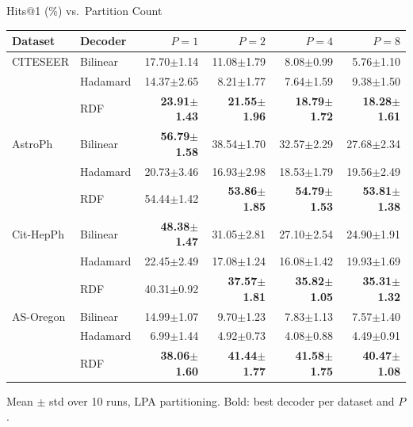 \documentclass[aspectratio=169]{beamer}
\begin{document}
\begin{frame}{Hits@1 (\%) vs.\ Partition Count}
  \scriptsize
  \begin{tabular}{llrrrr}
    \toprule
    Dataset & Decoder & $P{=}1$ & $P{=}2$ & $P{=}4$ & $P{=}8$ \\
    \midrule
    CITESEER  & Bilinear  & 17.70$\pm$1.14 & 11.08$\pm$1.79 & 8.08$\pm$0.99 & 5.76$\pm$1.10 \\
              & Hadamard  & 14.37$\pm$2.65 & 8.21$\pm$1.77 & 7.64$\pm$1.59 & 9.38$\pm$1.50 \\
              & RDF       & \textbf{23.91$\pm$1.43} & \textbf{21.55$\pm$1.96} & \textbf{18.79$\pm$1.72} & \textbf{18.28$\pm$1.61} \\
    \midrule
    AstroPh   & Bilinear  & \textbf{56.79$\pm$1.58} & 38.54$\pm$1.70 & 32.57$\pm$2.29 & 27.68$\pm$2.34 \\
              & Hadamard  & 20.73$\pm$3.46 & 16.93$\pm$2.98 & 18.53$\pm$1.79 & 19.56$\pm$2.49 \\
              & RDF       & 54.44$\pm$1.42 & \textbf{53.86$\pm$1.85} & \textbf{54.79$\pm$1.53} & \textbf{53.81$\pm$1.38} \\
    \midrule
    Cit-HepPh & Bilinear  & \textbf{48.38$\pm$1.47} & 31.05$\pm$2.81 & 27.10$\pm$2.54 & 24.90$\pm$1.91 \\
              & Hadamard  & 22.45$\pm$2.49 & 17.08$\pm$1.24 & 16.08$\pm$1.42 & 19.93$\pm$1.69 \\
              & RDF       & 40.31$\pm$0.92 & \textbf{37.57$\pm$1.81} & \textbf{35.82$\pm$1.05} & \textbf{35.31$\pm$1.32} \\
    \midrule
    AS-Oregon & Bilinear  & 14.99$\pm$1.07 & 9.70$\pm$1.23 & 7.83$\pm$1.13 & 7.57$\pm$1.40 \\
              & Hadamard  & 6.99$\pm$1.44 & 4.92$\pm$0.73 & 4.08$\pm$0.88 & 4.49$\pm$0.91 \\
              & RDF       & \textbf{38.06$\pm$1.60} & \textbf{41.44$\pm$1.77} & \textbf{41.58$\pm$1.75} & \textbf{40.47$\pm$1.08} \\
    \bottomrule
  \end{tabular}

  \vspace{0.5em}
  \scriptsize Mean $\pm$ std over 10 runs, LPA partitioning. Bold: best decoder per dataset and $P$.
\end{frame}
\end{document}
